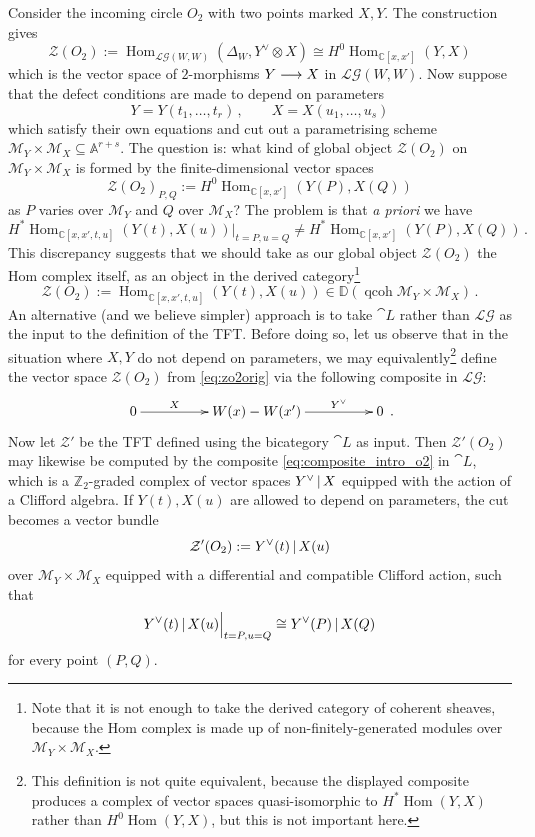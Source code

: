 \documentclass[english,letter paper,12pt,leqno]{article}
\theoremstyle{example}
\numberwithin{equation}{section}
\def\LG{\mathcal{LG}}
\def\Hom{\operatorname{Hom}}
\def\be{\begin{equation}}
\def\ee{\end{equation}}
\def\nZ{\mathds{Z}}
\def\nC{\mathds{C}}
\begin{document}
Consider the incoming circle $O_2$ with two points marked $X,Y$. The construction gives
\be\label{eq:zo2orig}
\mathcal{Z}(O_2) := \Hom_{\LG(W,W)}( \Delta_W, Y^{\vee} \otimes X) \cong H^0 \Hom_{\nC[x,x']}( Y, X )
\ee
which is the vector space of $2$-morphisms $Y \longrightarrow X$ in $\LG(W,W)$. Now suppose that the defect conditions are made to depend on parameters 
\[
Y = Y(t_1,\ldots,t_r)\,, \qquad X = X(u_1,\ldots,u_s)
\]
which satisfy their own equations and cut out a parametrising scheme $\mathscr{M}_Y \times \mathscr{M}_X \subseteq \mathbb{A}^{r+s}$. The question is: what kind of global object $\mathcal{Z}(O_2)$ on $\mathscr{M}_Y \times \mathscr{M}_X$ is formed by the finite-dimensional vector spaces
\[
\mathcal{Z}(O_2)_{P,Q} := H^0 \Hom_{\nC[x,x']}( Y(P), X(Q) )
\]
as $P$ varies over $\mathscr{M}_Y$ and $Q$ over $\mathscr{M}_X$? The problem is that \emph{a priori} we have
\be\label{eq:cohom_sucks}
H^* \Hom_{\nC[x,x',t,u]}( Y(t), X(u) ) \Big\vert_{t=P, u=Q} \neq H^* \Hom_{\nC[x,x']}( Y(P), X(Q) )\,.
\ee
This discrepancy suggests that we should take as our global object $\mathcal{Z}(O_2)$ the Hom complex itself, as an object in the derived category\footnote{Note that it is not enough to take the derived category of coherent sheaves, because the Hom complex is made up of non-finitely-generated modules over $\mathscr{M}_Y \times \mathscr{M}_X$.}
\be\label{eq:wuhe20}
\mathcal{Z}(O_2) := \Hom_{\nC[x,x',t,u]}( Y(t), X(u) ) \in \mathbb{D}( \operatorname{qcoh} \mathscr{M}_Y \times \mathscr{M}_X )\,.
\ee
An alternative (and we believe simpler) approach is to take $\cat{L}$ rather than $\LG$ as the input to the definition of the TFT. Before doing so, let us observe that in the situation where $X,Y$ do not depend on parameters, we may equivalently\footnote{This definition is not quite equivalent, because the displayed composite produces a complex of vector spaces quasi-isomorphic to $H^* \Hom(Y,X)$ rather than $H^0 \Hom(Y,X)$, but this is not important here.} define the vector space $\mathcal{Z}(O_2)$ from \eqref{eq:zo2orig} via the following composite in $\LG$:
\be\label{eq:composite_intro_o2}
\xymatrix@C+2pc{
0 \ar[r]^-X & W(x) - W(x') \ar[r]^-{Y^{\vee}} & 0
}\,.
\ee
Now let $\mathcal{Z}'$ be the TFT defined using the bicategory $\cat{L}$ as input. Then $\mathcal{Z}'(O_2)$ may likewise be computed by the composite \eqref{eq:composite_intro_o2} in $\cat{L}$, which is a $\nZ_2$-graded complex of vector spaces $Y^{\vee} \,|\, X$ equipped with the action of a Clifford algebra. If $Y(t), X(u)$ are allowed to depend on parameters, the cut becomes a vector bundle
\be\label{eq:orynx}
\mathcal{Z}'(O_2) := Y^{\vee}(t) \l X(u)
\ee
over $\mathscr{M}_Y \times \mathscr{M}_X$ equipped with a differential and compatible Clifford action, such that
\be
Y^{\vee}(t) \l X(u) \Big\vert_{t=P,u=Q} \cong Y^{\vee}(P) \l X(Q)
\ee
for every point $(P,Q)$.
\end{document}
